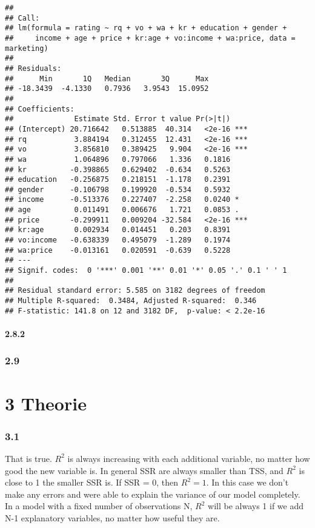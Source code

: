 \documentclass[
]{article}
\begin{document}
\begin{verbatim}
## 
## Call:
## lm(formula = rating ~ rq + vo + wa + kr + education + gender + 
##     income + age + price + kr:age + vo:income + wa:price, data = marketing)
## 
## Residuals:
##      Min       1Q   Median       3Q      Max 
## -18.3439  -4.1330   0.7936   3.9543  15.0952 
## 
## Coefficients:
##              Estimate Std. Error t value Pr(>|t|)    
## (Intercept) 20.716642   0.513885  40.314   <2e-16 ***
## rq           3.884194   0.312455  12.431   <2e-16 ***
## vo           3.856810   0.389425   9.904   <2e-16 ***
## wa           1.064896   0.797066   1.336   0.1816    
## kr          -0.398865   0.629402  -0.634   0.5263    
## education   -0.256875   0.218151  -1.178   0.2391    
## gender      -0.106798   0.199920  -0.534   0.5932    
## income      -0.513376   0.227407  -2.258   0.0240 *  
## age          0.011491   0.006676   1.721   0.0853 .  
## price       -0.299911   0.009204 -32.584   <2e-16 ***
## kr:age       0.002934   0.014451   0.203   0.8391    
## vo:income   -0.638339   0.495079  -1.289   0.1974    
## wa:price    -0.013161   0.020591  -0.639   0.5228    
## ---
## Signif. codes:  0 '***' 0.001 '**' 0.01 '*' 0.05 '.' 0.1 ' ' 1
## 
## Residual standard error: 5.585 on 3182 degrees of freedom
## Multiple R-squared:  0.3484, Adjusted R-squared:  0.346 
## F-statistic: 141.8 on 12 and 3182 DF,  p-value: < 2.2e-16
\end{verbatim}

\hypertarget{section-10}{%
\paragraph{2.8.2}\label{section-10}}

\hypertarget{section-11}{%
\subsubsection{2.9}\label{section-11}}

\hypertarget{theorie}{%
\section{3 Theorie}\label{theorie}}

\hypertarget{section-12}{%
\subsubsection{3.1}\label{section-12}}

That is true. \(R^2\) is always increasing with each additional
variable, no matter how good the new variable is. In general SSR are
always smaller than TSS, and \(R^2\) is close to 1 the smaller SSR is.
If SSR = 0, then \(R^2 = 1\). In this case we don't make any errors and
were able to explain the variance of our model completely. In a model
with a fixed number of observations N, \(R^2\) will be always 1 if we
add N-1 explanatory variables, no matter how useful they are.
\end{document}
